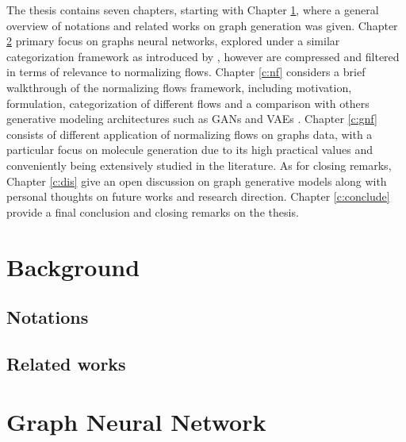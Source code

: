 The thesis contains seven chapters, starting with Chapter \ref{c:bg}, where a
general overview of notations and related works on graph generation was given.
Chapter \ref{c:gnn} primary focus on graphs neural networks, explored under a
similar categorization framework as introduced by
\cite{zhouGraphNeuralNetworks2020}, however are compressed and filtered in terms
of relevance to normalizing flows. Chapter \ref{c:nf} considers a brief
walkthrough of the normalizing flows framework, including motivation,
formulation, categorization of different flows and a comparison with others
generative modeling architectures such as GANs
\cite{goodfellowGenerativeAdversarialNetworks2014} and VAEs
\cite{kingmaAutoEncodingVariationalBayes2014}. Chapter \ref{c:gnf} consists of
different application of normalizing flows on graphs data, with a particular
focus on molecule generation due to its high practical values and conveniently
being extensively studied in the literature. As for closing remarks, Chapter
\ref{c:dis} give an open discussion on graph generative models along with
personal thoughts on future works and research direction. Chapter
\ref{c:conclude} provide a final conclusion and closing remarks on the thesis.


\chapter{Background}
\label{c:bg}
\section{Notations}
\section{Related works}

\chapter{Graph Neural Network}
\label{c:gnn}

